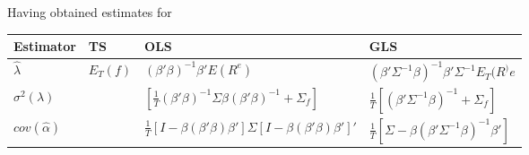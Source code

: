 \documentclass[]{article}
\begin{document}
\begin{itemize}
\begin{itemize}
	\end{itemize}
	
	Having obtained estimates for 
	
	\begin{tabular}{|l|l|l|l|}
		\hline
		Estimator & TS & OLS & GLS \\
		\hline
		$\hat{\lambda}$&$E_T(f)$&$(\beta'\beta)^{-1}\beta'E(R^e)$&$\left(\beta'\Sigma^{-1}\beta\right)^{-1}\beta'\Sigma^{-1}E_T(R^)e$\\
		$\sigma^2(\lambda)$ &  &   $\left[\frac{1}{T}(\beta'\beta)^{-1}\Sigma\beta(\beta'\beta)^{-1}+\Sigma_f\right]$  & $\frac{1}{T}\left[(\beta'\Sigma^{-1}\beta)^{-1}+\Sigma_f\right]$ \\
		$cov(\hat{\alpha})$&&$\frac{1}{T}\left[I-\beta(\beta'\beta)\beta'\right]\Sigma\left[I-\beta(\beta'\beta)\beta'\right]'$&$\frac{1}{T}\left[\Sigma-\beta(\beta'\Sigma^{-1}\beta)^{-1}\beta'\right]$\\
		\hline
	\end{tabular}
	
\end{itemize}
\end{document}

